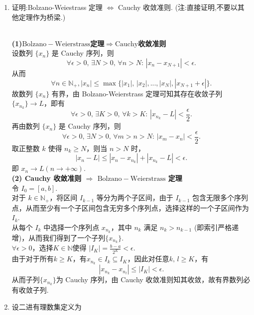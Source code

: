 \begin{enumerate}
    \item[12.]证明:Bolzano-Weiestrass 定理 $\Leftrightarrow$ Cauchy 收敛准则. (注:直接证明,不要以其他定理作为桥梁.)
    \begin{solution}\\
        \textbf{(1)$\mathrm{Bolzano-Weierstrass}$定理$\Rightarrow$$\mathrm{Cauchy}$收敛准则}\\
        设数列 $\{x_{n}\}$ 是 Cauchy 序列，则
        \[
        \forall \epsilon>0,\,\exists N>0,\,\forall n>N:\,\left|x_{n}-x_{N+1}\right|<\epsilon.
        \]
        从而
        \[
        \forall n\in\mathbb{N}_{+}, \left|x_{n}\right|\leq \max\{\left|x_{1}\right|,\,\left|x_{2}\right|,...,\left|x_{N}\right|,\left|x_{N+1}+\epsilon\right|\}.
        \]
        故数列 $\{x_{n}\}$ 有界，由 Bolzano-Weierstrass 定理可知其存在收敛子列 $\{x_{n_{k}}\}\to L$，即有
        \[
        \forall \epsilon>0,\,\exists K>0,\,\forall k>K:\,\left|x_{n_{k}}-L\right|<\frac{\epsilon}{2}.
        \]
        再由数列 $\{x_{n}\}$ 是 Cauchy 序列，则
        \[
        \forall \epsilon>0,\,\exists N>0,\,\forall m>n>N:\,\left|x_{m}-x_{n}\right|<\frac{\epsilon}{2}.
        \]
        取正整数 $k$ 使得 $n_{k}\geq N$，则当 $n>N$ 时，
        \[
        \left|x_{n}-L\right|\leq \left|x_{n}-x_{n_{k}}\right|+\left|x_{n_{k}}-L\right|<\epsilon.
        \]
        即 $x_{n}\to L(n\to +\infty)$.\\
        \textbf{(2) Cauchy 收敛准则 $\Rightarrow$ $\mathrm{Bolzano-Weierstrass}$ 定理}\\
        令 $I_{0}=[a,b]$.\\
        对于 $k\in\mathbb{N}_{+}$，将区间 $I_{k-1}$ 等分为两个子区间，由于 $I_{k-1}$ 包含无限多个序列点，从而至少有一个子区间包含无穷多个序列点，选择这样的一个子区间作为 $I_{k}$.\\
        从每个 $I_{k}$ 中选择一个序列点 $x_{n_{k}}$，其中 $n_{k}$ 满足 $n_{k}>n_{k-1}$ (即索引严格递增)，从而我们得到了一个子列$\{x_{n_{k}}\}$.\\
        $\forall \epsilon>0$，选择$K\in\mathbb{N}$使得 $\displaystyle \left|I_{K}\right|=\frac{b-a}{2^K}<\epsilon$.\\
        由于对于所有$k\geq K$，有$x_{n_{k}}\in I_{k}\subseteq I_{K}$，因此对任意$k,\,l\geq K$，有
        \[
        \left|x_{n_{k}}-x_{n_{l}}\right|\leq \left|I_{K}\right|<\epsilon.
        \]
        从而子列$\{x_{n_{k}}\}$为 Cauchy 序列，由 Cauchy 收敛准则知其收敛，故有界数列必有收敛子列.
    \end{solution}

    \item[13.]设二进有理数集定义为


\end{enumerate}

